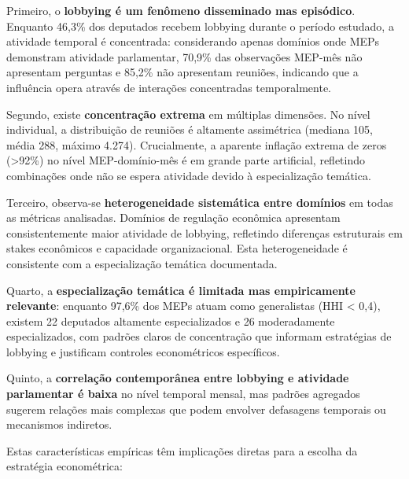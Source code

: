 Primeiro, o \textbf{lobbying é um fenômeno disseminado mas episódico}. Enquanto 46,3\% dos deputados recebem lobbying durante o período estudado, a atividade temporal é concentrada: considerando apenas domínios onde MEPs demonstram atividade parlamentar, 70,9\% das observações MEP-mês não apresentam perguntas e 85,2\% não apresentam reuniões, indicando que a influência opera através de interações concentradas temporalmente.

Segundo, existe \textbf{concentração extrema} em múltiplas dimensões. No nível individual, a distribuição de reuniões é altamente assimétrica (mediana 105, média 288, máximo 4.274). Crucialmente, a aparente inflação extrema de zeros (>92\%) no nível MEP-domínio-mês é em grande parte artificial, refletindo combinações onde não se espera atividade devido à especialização temática.

Terceiro, observa-se \textbf{heterogeneidade sistemática entre domínios} em todas as métricas analisadas. Domínios de regulação econômica apresentam consistentemente maior atividade de lobbying, refletindo diferenças estruturais em stakes econômicos e capacidade organizacional. Esta heterogeneidade é consistente com a especialização temática documentada.

Quarto, a \textbf{especialização temática é limitada mas empiricamente relevante}: enquanto 97,6\% dos MEPs atuam como generalistas (HHI < 0,4), existem 22 deputados altamente especializados e 26 moderadamente especializados, com padrões claros de concentração que informam estratégias de lobbying e justificam controles econométricos específicos.

Quinto, a \textbf{correlação contemporânea entre lobbying e atividade parlamentar é baixa} no nível temporal mensal, mas padrões agregados sugerem relações mais complexas que podem envolver defasagens temporais ou mecanismos indiretos.


Estas características empíricas têm implicações diretas para a escolha da estratégia econométrica:

